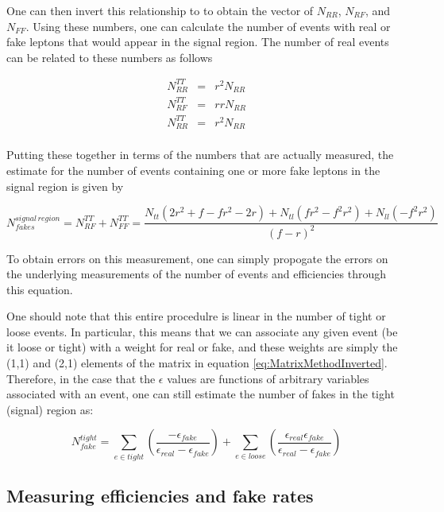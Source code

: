 One can then invert this relationship to to obtain the vector of $N_{RR}$, $N_{RF}$, and $N_{FF}$.
Using these numbers, one can calculate the number of events with real or fake leptons that would appear in the signal region.
The number of real events can be related to these numbers as follows

\begin{eqnarray*}
  N_{RR}^{TT} & = & r^2 N_{RR} \\  
  N_{RF}^{TT} & = & r r N_{RR} \\
  N_{RR}^{TT} & = & r^2 N_{RR} \\
\end{eqnarray*}

Putting these together in terms of the numbers that are actually measured, the estimate for the number of events containing one or more fake leptons in the signal region is given by

\begin{equation}
N_{fakes}^{signal \, region} =  N_{RF}^{TT} + N_{FF}^{TT} = \frac{ N_{tt}(2r^2 + f - fr^2-2r) + N_{tl}(fr^2-f^2r^2) + N_{ll}(-f^2r^2) }{(f-r)^2} 
\end{equation}


To obtain errors on this measurement, one can simply propogate the errors on the underlying measurements of the number of events and efficiencies through this equation.



One should note that this entire procedulre is linear in the number of tight or loose events.
In particular, this means that we can associate any given event (be it loose or tight) with a weight for real or fake, and these weights are simply the (1,1) and (2,1) elements of the matrix in equation \ref{eq:MatrixMethodInverted}.
Therefore, in the case that the $\epsilon$ values are functions of arbitrary variables associated with an event, one can still estimate the number of fakes in the tight (signal) region as:

\begin{equation}
  N^{tight}_{fake} = \sum_{e \in tight} (\frac{-\epsilon_{fake}}{\epsilon_{real} - \epsilon_{fake}}) + \sum_{e \in loose} (\frac{\epsilon_{real}\epsilon_{fake}}{\epsilon_{real} - \epsilon_{fake}})
  \label{eq:MatrixMethodSum}
\end{equation}



\subsection{Measuring efficiencies and fake rates}

